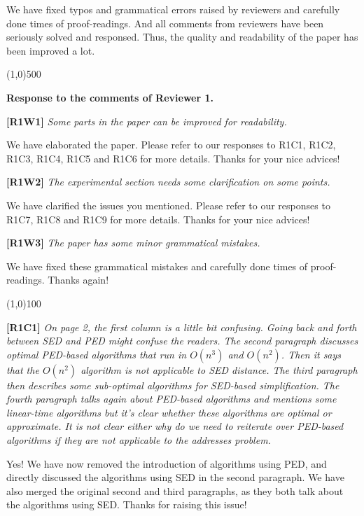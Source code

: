 \documentclass{letter}
\begin{document}
We have fixed typos and grammatical errors raised by reviewers and carefully done times of proof-readings. And all comments from reviewers have been seriously solved and responsed. Thus, the quality and readability of the paper has been improved a lot.

\line(1,0){500}

\textbf{Response to the comments of Reviewer 1.}

\textbf{[R1W1]} \emph{Some parts in the paper can be improved for readability.}

We have elaborated the paper. Please refer to our responses to R1C1, R1C2, R1C3, R1C4, R1C5 and R1C6 for more details. Thanks for your nice advices!

\textbf{[R1W2]} \emph{The experimental section needs some clarification on some points.}

We have clarified the issues you mentioned. Please refer to our responses to R1C7, R1C8 and R1C9 for more details. Thanks for your nice advices!

\textbf{[R1W3]} \emph{The paper has some minor grammatical mistakes.}

We have fixed these grammatical mistakes and carefully done times of proof-readings. Thanks again!

\line(1,0){100}

\textbf{[R1C1]} \emph{On page 2, the first column is a little bit confusing. Going back and forth between SED and PED might confuse the readers. The second paragraph discusses optimal PED-based algorithms that run in $O(n^3)$ and $O(n^2)$. Then it says that the $O(n^2)$ algorithm is not applicable to SED distance. The third paragraph then describes some sub-optimal algorithms for SED-based simplification. {The fourth paragraph talks again about PED-based algorithms and mentions some linear-time algorithms but it's clear whether these algorithms are optimal or approximate. It is not clear either why do we need to reiterate over PED-based algorithms if they are not applicable to the addresses problem.}}

Yes! We have now removed the introduction of algorithms using PED, and directly discussed the algorithms using SED in the second paragraph. We have also merged the original second and third paragraphs, as they both talk about the algorithms using SED. Thanks for raising this issue!
 


\end{document}
